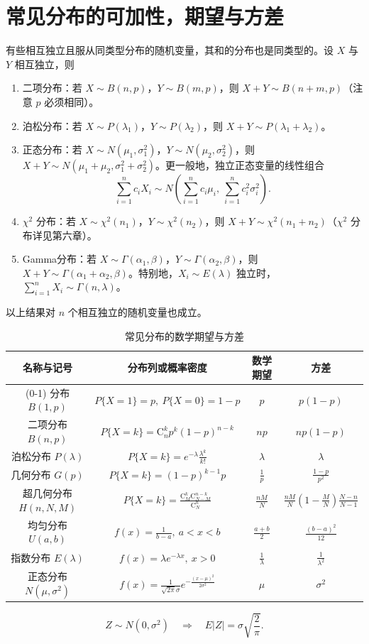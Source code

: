 \documentclass[lang=cn,11pt]{elegantbook}
\begin{document}
\section{常见分布的可加性，期望与方差}
\begin{property}[常见分布的可加性]\label{prop:additivity}
有些相互独立且服从同类型分布的随机变量，其和的分布也是同类型的。设 $X$ 与 $Y$ 相互独立，则
\begin{enumerate}
    \item 二项分布：若 $X \sim B(n,p)$，$Y \sim B(m,p)$，则 $X + Y \sim B(n+m,p)$（注意 $p$ 必须相同）。
    \item 泊松分布：若 $X \sim P(\lambda_1)$，$Y \sim P(\lambda_2)$，则 $X + Y \sim P(\lambda_1 + \lambda_2)$。
    \item 正态分布：若 $X \sim N(\mu_1, \sigma_1^2)$，$Y \sim N(\mu_2, \sigma_2^2)$，则 $X + Y \sim N(\mu_1 + \mu_2, \sigma_1^2 + \sigma_2^2)$。更一般地，独立正态变量的线性组合
    \[
    \sum_{i=1}^{n}c_i X_i \sim N\!\left(\sum_{i=1}^{n}c_i\mu_i,\ \sum_{i=1}^{n}c_i^2\sigma_i^2\right).
    \]
    \item $\chi^2$ 分布：若 $X \sim \chi^2(n_1)$，$Y \sim \chi^2(n_2)$，则 $X + Y \sim \chi^2(n_1 + n_2)$（$\chi^2$ 分布详见第六章）。
    \item Gamma分布：若 $X \sim \Gamma(\alpha_1, \beta)$，$Y \sim \Gamma(\alpha_2, \beta)$，则 $X + Y \sim \Gamma(\alpha_1 + \alpha_2, \beta)$。特别地，$X_i \sim E(\lambda)$ 独立时，$\sum_{i=1}^{n}X_i \sim \Gamma(n, \lambda)$。
\end{enumerate}
以上结果对 $n$ 个相互独立的随机变量也成立。
\end{property}
\begin{table}[h]
\centering
\caption{常见分布的数学期望与方差} \label{tab:dist-expect-var}
\begin{tabular}{c|c|c|c}
\toprule
名称与记号 & 分布列或概率密度 & 数学期望 & 方差 \\
\midrule
(0-1) 分布 $B(1,p)$ & $P\{X=1\}=p,\ P\{X=0\}=1-p$ & $p$ & $p(1-p)$ \\
二项分布 $B(n,p)$ & $P\{X=k\}=\mathrm{C}_n^k p^k (1-p)^{n-k}$ & $np$ & $np(1-p)$ \\
泊松分布 $P(\lambda)$ & $P\{X=k\}=e^{-\lambda}\frac{\lambda^k}{k!}$ & $\lambda$ & $\lambda$ \\
几何分布 $G(p)$ & $P\{X=k\}=(1-p)^{k-1}p$ & $\frac{1}{p}$ & $\frac{1-p}{p^2}$ \\
超几何分布 $H(n,N,M)$ & $P\{X=k\}=\frac{\mathrm{C}_M^k \mathrm{C}_{N-M}^{n-k}}{\mathrm{C}_N^n}$ & $\frac{nM}{N}$ & $\frac{nM}{N}\left(1-\frac{M}{N}\right)\frac{N-n}{N-1}$ \\
\midrule
均匀分布 $U(a,b)$ & $f(x)=\frac{1}{b-a},\ a < x < b$ & $\frac{a+b}{2}$ & $\frac{(b-a)^2}{12}$ \\
指数分布 $E(\lambda)$ & $f(x)=\lambda e^{-\lambda x},\ x > 0$ & $\frac{1}{\lambda}$ & $\frac{1}{\lambda^2}$ \\
正态分布 $N(\mu,\sigma^2)$ & $f(x)=\frac{1}{\sqrt{2\pi}\sigma}e^{-\frac{(x-\mu)^2}{2\sigma^2}}$ & $\mu$ & $\sigma^2$ \\
\bottomrule
\end{tabular}
\end{table}
\[
\boxed{Z\sim N(0,\sigma^2)\quad\Longrightarrow\quad E|Z|=\sigma\sqrt{\frac2\pi}.}
\]
\end{document}
